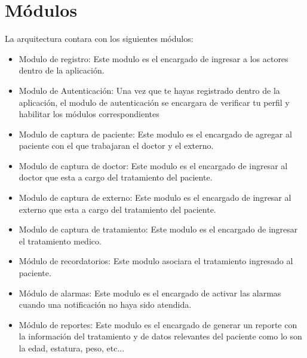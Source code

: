 \section{Módulos}
La arquitectura contara con los siguientes módulos:
\begin{itemize}
	\item Modulo de registro: Este modulo es el encargado de ingresar a los actores dentro de la aplicación.
	
	
	\item Modulo de Autenticación: Una vez que te hayas registrado dentro de la aplicación, el modulo de autenticación se encargara de verificar tu perfil y habilitar los módulos correspondientes
	
	 
	\item Modulo de captura de paciente: Este modulo es el encargado de agregar al paciente con el que trabajaran el doctor y el externo.
	
	\item Modulo de captura de doctor: Este modulo es el encargado de ingresar al doctor que esta a cargo del tratamiento del paciente.
	
	\item Modulo de captura de externo: Este modulo es el encargado de ingresar al externo que esta a cargo del tratamiento del paciente.
	
	\item Modulo de captura de tratamiento: Este modulo es el encargado de ingresar el tratamiento medico. 
	
	\item Módulo de recordatorios: Este modulo asociara el tratamiento ingresado al paciente.
	
	\item Módulo de alarmas: Este modulo es el encargado de activar las alarmas cuando una notificación no haya sido atendida.
	
	\item Módulo de reportes: Este modulo es el encargado de generar un reporte con la información del tratamiento y de datos relevantes del paciente como lo son la edad, estatura, peso, etc...
	
	
	
	
	

\end{itemize}
